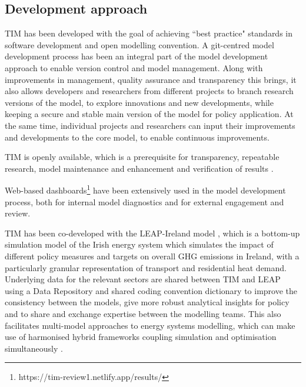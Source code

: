 \documentclass[journal abbreviation, manuscript]{copernicus}
\begin{document}
\subsection{Development approach}
\label{ss:model_dev}


TIM has been developed with the goal of achieving ``best practice" standards in software development and open modelling convention. A git-centred model development process has been an integral part of the model development approach to enable version control and model management. Along with improvements in management, quality assurance and transparency this brings, it also allows developers and researchers from different projects to branch research versions of the model, to explore innovations and new developments, while keeping a secure and stable main version of the model for policy application. At the same time, individual projects and researchers can input their improvements and developments to the core model, to enable continuous improvements. 

TIM is openly available, which is a prerequisite for transparency, repeatable research, model maintenance and enhancement and verification of results \citep{Pfenninger2018}. 

Web-based dashboards\footnote{https://tim-review1.netlify.app/results/} have been extensively used in the model development process, both for internal model diagnostics and for external engagement and review. 

TIM has been co-developed with the LEAP-Ireland model \citep{MacUidhir2020}, which is a bottom-up simulation model of the Irish energy system which simulates the impact of different policy measures and targets on overall GHG emissions in Ireland, with a particularly granular representation of transport and residential heat demand. Underlying data for the relevant sectors are shared between TIM and LEAP using a Data Repository and shared coding convention dictionary to improve the consistency between the models, give more robust analytical insights for policy and to share and exchange expertise between the modelling teams. This also facilitates multi-model approaches to energy systems modelling, which can make use of harmonised hybrid frameworks coupling simulation and optimisation simultaneously \citep{rogan2014leaps}.
\end{document}
